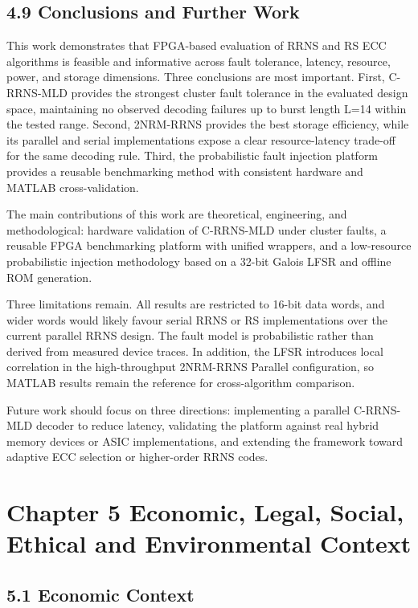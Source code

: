 \documentclass[
  12pt,
  a4paper]{report}
\begin{document}
\section{4.9 Conclusions and Further
Work}\label{conclusions-and-further-work}

This work demonstrates that FPGA-based evaluation of RRNS and RS ECC
algorithms is feasible and informative across fault tolerance, latency,
resource, power, and storage dimensions. Three conclusions are most
important. First, C-RRNS-MLD provides the strongest cluster fault
tolerance in the evaluated design space, maintaining no observed
decoding failures up to burst length L=14 within the tested range.
Second, 2NRM-RRNS provides the best storage efficiency, while its
parallel and serial implementations expose a clear resource-latency
trade-off for the same decoding rule. Third, the probabilistic fault
injection platform provides a reusable benchmarking method with
consistent hardware and MATLAB cross-validation.

The main contributions of this work are theoretical, engineering, and
methodological: hardware validation of C-RRNS-MLD under cluster faults,
a reusable FPGA benchmarking platform with unified wrappers, and a
low-resource probabilistic injection methodology based on a 32-bit
Galois LFSR and offline ROM generation.

Three limitations remain. All results are restricted to 16-bit data
words, and wider words would likely favour serial RRNS or RS
implementations over the current parallel RRNS design. The fault model
is probabilistic rather than derived from measured device traces. In
addition, the LFSR introduces local correlation in the high-throughput
2NRM-RRNS Parallel configuration, so MATLAB results remain the reference
for cross-algorithm comparison.

Future work should focus on three directions: implementing a parallel
C-RRNS-MLD decoder to reduce latency, validating the platform against
real hybrid memory devices or ASIC implementations, and extending the
framework toward adaptive ECC selection or higher-order RRNS codes.

\chapter{Chapter 5 Economic, Legal, Social, Ethical and Environmental
Context}\label{chapter-5-economic-legal-social-ethical-and-environmental-context}

\section{5.1 Economic Context}\label{economic-context}
\end{document}
